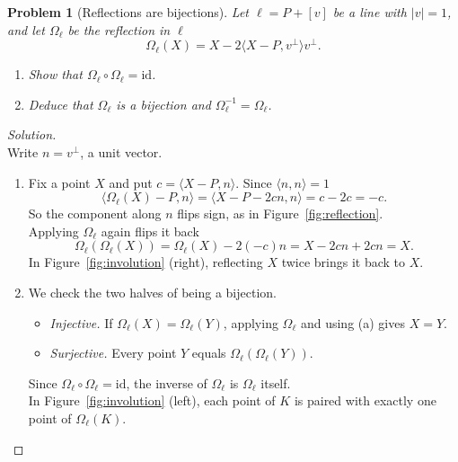\documentclass[11pt,a4paper]{article}
\theoremstyle{boxed}
\newtheorem{problem}{Problem}
\theoremstyle{definition}
\newenvironment{solution}{\begin{proof}[Solution]}{\end{proof}}
\newcommand{\ip}[2]{\langle #1, #2 \rangle}
\newcommand{\abs}[1]{\lvert #1 \rvert}
\newcommand{\id}{\mathrm{id}}
\begin{document}
\newpage
\begin{problem}[Reflections are bijections]\label{p:bijection}
Let $\ell=P+[v]$ be a line with $\abs{v}=1$, and let $\Omega_\ell$ be the reflection in $\ell$
\[
\Omega_\ell(X)=X-2\ip{X-P}{v^\perp}v^\perp.
\]
\begin{enumerate}
    \item Show that $\Omega_\ell\circ\Omega_\ell=\id$.
    \item Deduce that $\Omega_\ell$ is a bijection and $\Omega_\ell^{-1}=\Omega_\ell$.
\end{enumerate}
\end{problem}

\begin{solution}
\leavevmode\\
Write $n=v^\perp$, a unit vector.
\begin{enumerate}
    \item Fix a point $X$ and put $c=\ip{X-P}{n}$. Since $\ip{n}{n}=1$
    \[
    \ip{\Omega_\ell(X)-P}{n}=\ip{X-P-2cn}{n}=c-2c=-c.
    \]
    So the component along $n$ flips sign, as in Figure~\ref{fig:reflection}.\\
    Applying $\Omega_\ell$ again flips it back
    \[
    \Omega_\ell(\Omega_\ell(X))=\Omega_\ell(X)-2(-c)n=X-2cn+2cn=X.
    \]
    In Figure~\ref{fig:involution} (right), reflecting $X$ twice brings it back to $X$.
    \item We check the two halves of being a bijection.
    \begin{itemize}[nosep]
        \item \emph{Injective.} If $\Omega_\ell(X)=\Omega_\ell(Y)$, applying $\Omega_\ell$ and using (a) gives $X=Y$.
        \item \emph{Surjective.} Every point $Y$ equals $\Omega_\ell(\Omega_\ell(Y))$.
    \end{itemize}
    Since $\Omega_\ell\circ\Omega_\ell=\id$, the inverse of $\Omega_\ell$ is $\Omega_\ell$ itself.\\
    In Figure~\ref{fig:involution} (left), each point of $K$ is paired with exactly one point of $\Omega_\ell(K)$. \qedhere
\end{enumerate}
\end{solution}
\end{document}
